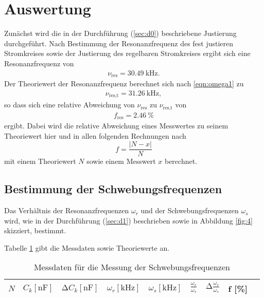 \section{Auswertung}
\label{sec:Auswertung}

Zunächst wird die in der Durchführung (\ref{sec:d0}) beschriebene Justierung durchgeführt.
Nach Bestimmung der Resonanzfrequenz des fest justieren Stromkreises sowie der Justierung des regelbaren Stromkreises ergibt sich eine Resonanzfrequenz von
\begin{align*}
\nu_{\text{res}} = \SI{30.49}{\kilo\hertz}.
\end{align*}
Der Theoriewert der Resonanzfrequenz berechnet sich nach \eqref{eqn:omega1} zu
\begin{align*}
  \nu_{\text{res,t}} = \SI{31.26}{\kilo\hertz},
\end{align*}
so dass sich eine relative Abweichung von $\nu_{\text{res}}$ zu $\nu_{\text{res,t}}$ von
\begin{align*}
  f_{\text{res}} = \SI{2.46}{\percent}
\end{align*}
ergibt.
Dabei wird die relative Abweichung eines Messwertes zu seinem Theoriewert hier und in allen folgenden Rechnungen nach
\begin{equation}
f = \frac{\lvert N - x \rvert }{N}
\label{eqn:rel_err}
\end{equation}
mit einem Theoriewert $N$ sowie einem Messwert $x$ berechnet.
\subsection{Bestimmung der Schwebungsfrequenzen}
Das Verhältnis der Resonanzfrequenzen $\omega_r$ und der Schwebungsfrequenzen $\omega_s$ wird, wie in der Durchführung (\ref{sec:d1}) beschrieben sowie in Abbildung \ref{fig:4} skizziert, bestimmt.

Tabelle \ref{tab:1} gibt die Messdaten sowie Theoriewerte an.

\begin{table}
  \centering
  \caption{Messdaten für die Messung der Schwebungsfrequenzen}
  \label{tab:1}
  \begin{tabular}{c c c c c c c c c}
    \toprule
    {$N$} & {$ C_k [\si{\nano\farad}] $} & {$\increment C_k [\si{\nano\farad}] $} & {$ \omega_r [\si{\kilo\hertz}] $} & {$ \omega_s [\si{\kilo\hertz}] $} & {$\frac{\omega_r}{\omega_s}_{\text{}}$} & {$\increment \frac{\omega_r}{\omega_s}_{\text{}}$} & {f [\%]} \\
    \midrule
    
    \bottomrule
  \end{tabular}
\end{table}



